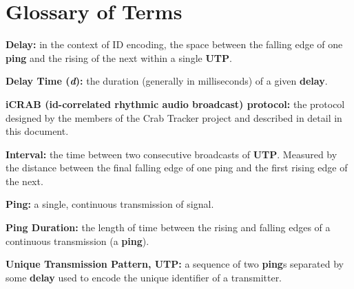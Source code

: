 \documentclass[12pt]{article}
\begin{document}

\appendix
\section{Glossary of Terms} \label{glossary}

{\bf Delay:}
	in the context of ID encoding, the space between the falling edge of one
	{\bf ping} and the rising of the next within a single {\bf UTP}.

{\bf Delay Time ({\em d}):}
	the duration (generally in milliseconds) of a given {\bf delay}.

{\bf iCRAB (id-correlated rhythmic audio broadcast) protocol:}
	the protocol designed by the members of the Crab Tracker project and
	described in detail in this document.

{\bf Interval:}
	the time between two consecutive broadcasts of {\bf UTP}. Measured by the
	distance between the final falling edge of one ping and the first rising
	edge of the next.

{\bf Ping:}
	a single, continuous transmission of signal.

{\bf Ping Duration:}
	the length of time between the rising and falling edges of a continuous
	transmission (a {\bf ping}).

{\bf Unique Transmission Pattern, UTP:}
	a sequence of two {\bf ping}s separated by some {\bf delay} used to
	encode the unique identifier of a transmitter.
\end{document}
